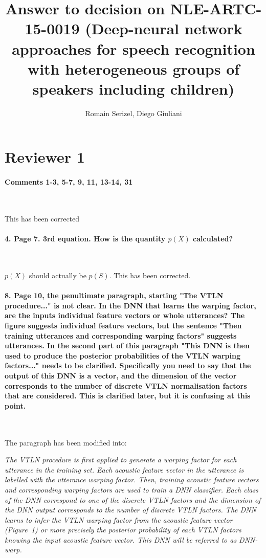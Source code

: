 \documentclass[]{article}
\title{Answer to decision on NLE-ARTC-15-0019 (Deep-neural network approaches for speech recognition with heterogeneous groups of speakers including children)}
\author{Romain Serizel, Diego Giuliani}
\begin{document}
\maketitle


\section{Reviewer 1}
\paragraph{Comments 1-3, 5-7, 9, 11, 13-14, 31}

~

This has been corrected
\paragraph{4. Page 7. 3rd equation. How is the quantity $p(X)$ calculated?}

~

$p(X)$ should actually be $p(S)$. This has been corrected.


\paragraph{8. Page 10, the penultimate paragraph, starting "The VTLN procedure..." is not clear. In the DNN that learns the warping
factor, are the inputs individual feature vectors or whole utterances? The figure suggests individual feature vectors, but the
sentence "Then training utterances and corresponding warping factors" suggests utterances. In the second part of this paragraph "This DNN is then used to produce the posterior probabilities of the VTLN warping factors..." needs to be clarified. Specifically you need to
say that the output of this DNN is a vector, and the dimension of the vector corresponds to the number of discrete VTLN normalisation
factors that are considered. This is clarified later, but it is confusing at this point.}

~

The paragraph has been modified into:

\textit{The VTLN procedure is first applied to generate a warping factor for each  utterance in the  training set. Each acoustic feature vector in the utterance is labelled with the utterance warping factor. Then, training acoustic feature vectors and corresponding warping factors are used to train a DNN classifier. Each class of the DNN correspond to one of the discrete VTLN factors and the dimension of the DNN output corresponds to the number of discrete VTLN factors. The DNN learns to infer the VTLN warping factor from the acoustic feature vector (Figure~1) or more precisely the posterior probability of each VTLN factors knowing the input acoustic feature vector. This DNN will be referred to as DNN-warp.}
\end{document}
